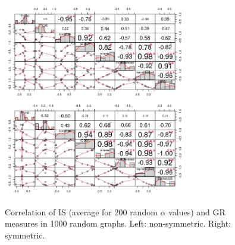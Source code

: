 \documentclass{article}
\begin{document}
\begin{figure}[htbp!]
  \centering{}
  \includegraphics[width=8cm]{img/corr1000group}\quad\quad
  \includegraphics[width=8cm]{img/corrS1000group}
  \caption{Correlation of IS (average for 200 random $\alpha$ values)
    and GR measures in 1000 random graphs. Left: non-symmetric. Right:
    symmetric.}
  \label{fig:corr1000group}
\end{figure}
\end{document}
